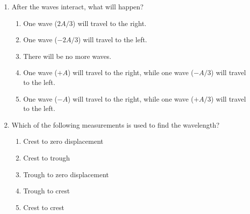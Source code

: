 \documentclass{../../../oss-apphys}
\begin{document}
\begin{multicols}{2}
\begin{enumerate}[leftmargin=18pt,resume]
  \item After the waves interact, what will happen?
    \label{des2}
    \begin{enumerate}[nosep,leftmargin=18pt,label=(\Alph*)]
    \item One wave ($2A/3$) will travel to the right.
    \item One wave ($-2A/3$) will travel to the left.
    \item There will be no more waves.
    \item One wave ($+A$) will travel to the right, while one wave ($-A/3$)
      will travel to the left.
    \item One wave ($-A$) will travel to the right, while one wave ($+A/3$)
      will travel to the left.
    \end{enumerate}
    \columnbreak
    
    
    


  \item Which of the following measurements is used to find the wavelength?
    \begin{enumerate}[nosep,leftmargin=18pt,label=(\Alph*)]
    \item Crest to zero displacement
    \item Crest to trough
    \item Trough to zero displacement
    \item Trough to crest
    \item Crest to crest
    \end{enumerate}
    \vspace{.7in}
    

\end{enumerate}
\end{multicols}
\end{document}
